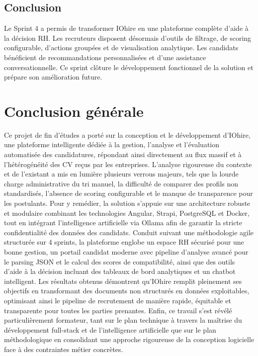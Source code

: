 \documentclass[12pt,a4paper,oneside]{report}
\begin{document}
\begin{itemize}
\section*{Conclusion}
Le Sprint 4 a permis de transformer IOhire en une plateforme complète d'aide à la décision RH. Les recruteurs disposent désormais d'outils de filtrage, de scoring configurable, d'actions groupées et de visualisation analytique. Les candidats bénéficient de recommandations personnalisées et d'une assistance conversationnelle. Ce sprint clôture le développement fonctionnel de la solution et prépare son amélioration future.



\chapter*{\vspace*{-2.5cm}Conclusion générale}
\vspace*{-1.5cm}
Ce projet de fin d’études a porté sur la conception et le développement d’IOhire, une plateforme intelligente dédiée à la gestion, l’analyse et l’évaluation automatisée des candidatures, répondant ainsi directement au flux massif et à l’hétérogénéité des CV reçus par les entreprises. L'analyse rigoureuse du contexte et de l'existant a mis en lumière plusieurs verrous majeurs, tels que la lourde charge administrative du tri manuel, la difficulté de comparer des profils non standardisés, l'absence de scoring configurable et le manque de transparence pour les postulants. Pour y remédier, la solution s'appuie sur une architecture robuste et modulaire combinant les technologies Angular, Strapi, PostgreSQL et Docker, tout en intégrant l'intelligence artificielle via Ollama afin de garantir la stricte confidentialité des données des candidats. Conduit suivant une méthodologie agile structurée sur 4 sprints, la plateforme englobe un espace RH sécurisé pour une bonne gestion, un portail candidat moderne avec pipeline d'analyse avancé pour le parsing JSON et le calcul des scores de compatibilité, ainsi que des outils d'aide à la décision incluant des tableaux de bord analytiques et un chatbot intelligent. Les résultats obtenus démontrent qu'IOhire remplit pleinement ses objectifs en transformant des documents non structurés en données exploitables, optimisant ainsi le pipeline de recrutement de manière rapide, équitable et transparente pour toutes les parties prenantes. Enfin, ce travail s’est révélé particulièrement formateur, tant sur le plan technique à travers la maîtrise du développement full-stack et de l'intelligence artificielle que sur le plan méthodologique en consolidant une approche rigoureuse de la conception logicielle face à des contraintes métier concrètes.



\end{itemize}
\end{document}
